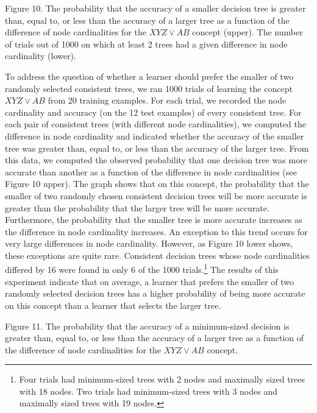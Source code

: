 \vspace{0.2cm}
\parindent 0.0cm
Figure 10. The probability that the accuracy of a smaller decision tree is
greater than, equal to, or less than the accuracy of a larger tree as
a function of the difference of node cardinalities for the $XYZ \vee
AB$ concept (upper).  The number of trials out of 1000 on which at
least 2 trees had a given difference in node cardinality (lower).\\
\parindent 0.6cm
\parskip 0.0cm

To address the question of whether a learner should prefer the
smaller of two randomly selected consistent trees, we ran 1000 trials
of learning the concept $XYZ \vee AB$ from 20 training examples.  For
each trial, we recorded the node cardinality and accuracy (on the 12
test examples) of every consistent tree.  For each pair of consistent
trees (with different node cardinalities), we computed the difference
in node cardinality and indicated whether the accuracy of the smaller
tree was greater than, equal to, or less than the accuracy of the
larger tree.  From this data, we computed the observed probability that
one decision tree was more accurate than another as a function of the
difference in node cardinalities (see Figure 10 upper).  The graph
shows that on this concept, the probability that the smaller of two
randomly chosen consistent decision trees will be more accurate is greater
than the probability that the larger tree will be more accurate.
Furthermore, the probability that the smaller tree is more accurate
increases as the difference in node cardinality increases.  An
exception to this trend occurs for very large differences in node
cardinality.  However, as Figure 10 lower shows, these exceptions are
quite rare. Consistent decision trees whose node cardinalities
differed by 16 were found in only 6 of the 1000 trials.\footnote{Four trials
had minimum-sized trees with 2 nodes and maximally sized trees with 18
nodes. Two trials had minimum-sized trees with 3 nodes and maximally
sized trees with 19 nodes.} The results of this experiment indicate that
on average, a learner that prefers the smaller of two randomly
selected decision trees has a higher probability of being more accurate
on this concept than a learner that selects the larger tree.

\vspace*{0.3cm}
\hspace{1.2cm}
\centerline{}

\vspace{0.2cm}
\parindent 0.0cm
Figure 11. The probability that the accuracy of a minimum-sized
decision is greater than, equal to, or less than the accuracy of a
larger tree as a function of the difference of node cardinalities for
the $XYZ \vee AB$ concept.\\
\parindent 0.6cm
\parskip 0.0cm

